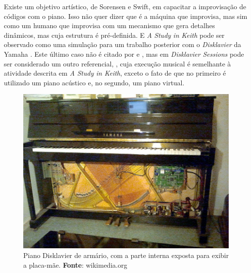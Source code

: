 Existe um objetivo artístico, de Sorensen e Swift, em capacitar a improvisação de códigos com o piano. Isso não quer dizer que é a máquina que improvisa, mas sim como um humano que improvisa com um mecanismo que gera detalhes dinâmicos, mas cuja estrutura é pré-definida. E \emph{A Study in Keith} pode ser observado como uma simulação para um trabalho posterior com o \emph{Disklavier} da Yamaha . Este último caso não é citado por  e , mas em \emph{Disklavier Sessions} \cite{sorensen_disklavier_2013} pode ser considerado um outro referencial, , cuja execução musical é semelhante à atividade descrita em \emph{A Study in Keith}, exceto o fato de que no primeiro é utilizado um piano acústico e, no segundo, um piano virtual.

\begin{figure}[h]
 \centering
  \includegraphics[scale=0.5]{imagens/disklavier.jpg}
  \caption{Piano Disklavier de armário, com a parte interna exposta para exibir a placa-mãe. \textbf{Fonte}: wikimedia.org}
  \label{fig:disklavier}
\end{figure}

\begin{citacao}
\end{citacao}


